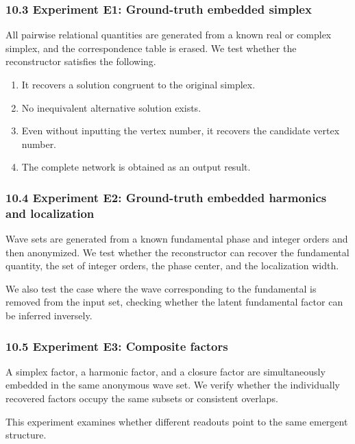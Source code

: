 \documentclass[
  a4paper,
]{article}
\providecommand{\tightlist}{%
  \setlength{\itemsep}{0pt}\setlength{\parskip}{0pt}}
\begin{document}
\subsubsection{10.3 Experiment E1: Ground-truth embedded
simplex}\label{experiment-e1-ground-truth-embedded-simplex}

All pairwise relational quantities are generated from a known real or
complex simplex, and the correspondence table is erased. We test whether
the reconstructor satisfies the following.

\begin{enumerate}
\def\labelenumi{\arabic{enumi}.}
\tightlist
\item
  It recovers a solution congruent to the original simplex.
\item
  No inequivalent alternative solution exists.
\item
  Even without inputting the vertex number, it recovers the candidate
  vertex number.
\item
  The complete network is obtained as an output result.
\end{enumerate}

\subsubsection{10.4 Experiment E2: Ground-truth embedded harmonics and
localization}\label{experiment-e2-ground-truth-embedded-harmonics-and-localization}

Wave sets are generated from a known fundamental phase and integer
orders and then anonymized. We test whether the reconstructor can
recover the fundamental quantity, the set of integer orders, the phase
center, and the localization width.

We also test the case where the wave corresponding to the fundamental is
removed from the input set, checking whether the latent fundamental
factor can be inferred inversely.

\subsubsection{10.5 Experiment E3: Composite
factors}\label{experiment-e3-composite-factors}

A simplex factor, a harmonic factor, and a closure factor are
simultaneously embedded in the same anonymous wave set. We verify
whether the individually recovered factors occupy the same subsets or
consistent overlaps.

This experiment examines whether different readouts point to the same
emergent structure.
\end{document}
